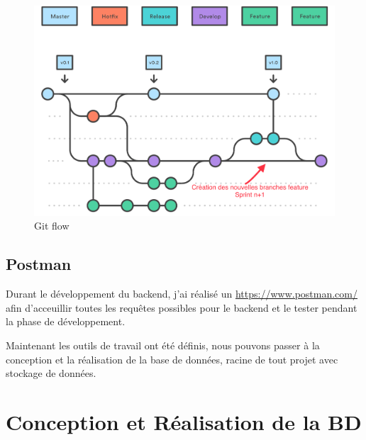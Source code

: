 \documentclass[
    iai, %
    il, %
]{heig-tb}
\begin{document}
\begin{center}
    \begin{figure}
        \includegraphics[width=\textwidth]{./assets/figures/git-flow.png}
        \caption{Git flow \label{git-flow}}
    \end{figure}
\end{center}

\section{Postman}
Durant le développement du \Gls{backend}, j'ai réalisé un \href{Postman collaboratif}{https://www.postman.com/} afin d'acceuillir toutes les requêtes possibles pour le backend et le tester pendant la phase de développement.

Maintenant les outils de travail ont été définis, nous pouvons passer à la conception et la réalisation de la base de données, racine de tout projet avec stockage de données.

\chapter{Conception et Réalisation de la BD}
\end{document}
